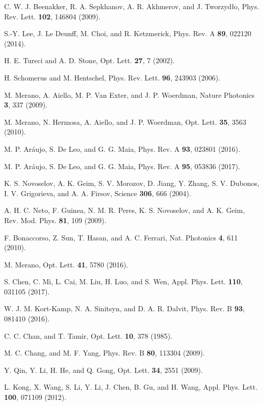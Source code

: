 \documentclass[twocolumn,showpacs,preprintnumbers,amsmath,amssymb]{revtex4}
\begin{document}
\begin{references}
 C. W. J. Beenakker, R. A. Sepkhanov, A. R. Akhmerov, and J. Tworzyd{\l}o, Phys. Rev. Lett. \textbf{102}, 146804 (2009).

 S.-Y. Lee, J. Le Deunff, M. Choi, and R. Ketzmerick, Phys. Rev. A \textbf{89}, 022120 (2014).

 H. E. Tureci and A. D. Stone, Opt. Lett. \textbf{27}, 7 (2002).

 H. Schomerus and M. Hentschel, Phys. Rev. Lett. \textbf{96}, 243903 (2006).

 M. Merano, A. Aiello, M. P. Van Exter, and J. P. Woerdman, Nature Photonics \textbf{3}, 337 (2009).

 M. Merano, N. Hermosa, A. Aiello, and J. P. Woerdman, Opt. Lett. \textbf{35}, 3563 (2010).

 M. P. Ar\'{a}ujo, S. De Leo, and G. G. Maia, Phys. Rev. A \textbf{93}, 023801 (2016).

 M. P. Ar\'{a}ujo, S. De Leo, and G. G. Maia, Phys. Rev. A \textbf{95}, 053836 (2017).

 K. S. Novoselov, A. K. Geim, S. V. Morozov, D. Jiang, Y. Zhang, S. V. Dubonos, I. V. Grigorieva, and A. A. Firsov, Science \textbf{306}, 666 (2004).

 A. H. C. Neto, F. Guinea, N. M. R. Peres, K. S. Novoselov, and A. K. Geim, Rev. Mod. Phys. \textbf{81}, 109 (2009).

 F. Bonaccorso, Z. Sun, T. Hasan, and A. C. Ferrari, Nat. Photonics \textbf{4}, 611 (2010).

 M. Merano, Opt. Lett. \textbf{41}, 5780 (2016).

 S. Chen, C. Mi, L. Cai, M. Liu, H. Luo, and S. Wen, Appl. Phys. Lett. \textbf{110}, 031105 (2017).

 W. J. M. Kort-Kamp, N. A. Sinitsyn, and D. A. R. Dalvit, Phys. Rev. B \textbf{93}, 081410 (2016).

 C. C. Chan, and T. Tamir, Opt. Lett. \textbf{10}, 378 (1985).

 M. C. Chang, and M. F. Yang, Phys. Rev. B \textbf{80}, 113304 (2009).

 Y. Qin, Y. Li, H. He, and Q. Gong, Opt. Lett. \textbf{34}, 2551 (2009).

 L. Kong, X. Wang, S. Li, Y. Li, J. Chen, B. Gu, and H. Wang, Appl. Phys. Lett. \textbf{100}, 071109 (2012).


\end{references}
\end{document}

